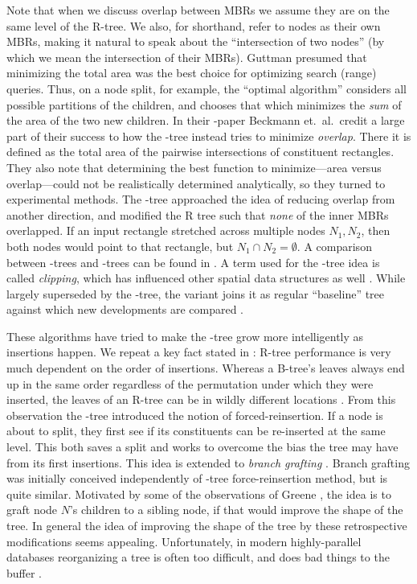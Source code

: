 Note that when we discuss overlap between MBRs we assume they are on the same level of the R-tree.
We also, for shorthand, refer to nodes as their own MBRs, making it natural to speak about the ``intersection of two nodes'' (by which we mean the intersection of their MBRs).
Guttman \cite{guttman84} presumed that minimizing the total area was the best choice for optimizing search (range) queries.
Thus, on a node split, for example, the ``optimal algorithm'' considers all possible partitions of the children, and chooses that which minimizes the \emph{sum} of the area of the two new children.
In their \rstar-paper \cite{beckmannkriegelschneiderseeger90} Beckmann et.\ al.\ credit a large part of their success to how the \rstar-tree instead tries to minimize \emph{overlap}.
There it is defined as the total area of the pairwise intersections of constituent rectangles.
They also note that determining the best function to minimize---area versus overlap---could not be realistically determined analytically, so they turned to experimental methods.
The \rplus-tree \cite{sellisroussopoulosfaloutsos87} approached the idea of reducing overlap from another direction, and modified the R tree such that \emph{none} of the inner MBRs overlapped.
If an input rectangle stretched across multiple nodes $N_1,N_2$, then both nodes would point to that rectangle, but $N_1\cap N_2=\emptyset$.
A comparison between \rbase-trees and \rplus-trees can be found in \cite{greene89}.
A term used for the \rplus-tree idea is called \emph{clipping}, which has influenced other spatial data structures as well \cite{gaedegunther98}.
While largely superseded by the \rstar-tree, the \rplus variant joins it as regular ``baseline'' tree against which new developments are compared \cite{thebook}.

These algorithms have tried to make the \rbase-tree grow more intelligently as insertions happen.
We repeat a key fact stated in \cite{beckmannkriegelschneiderseeger90}: R-tree performance is very much dependent on the order of insertions.
Whereas a B-tree's leaves always end up in the same order regardless of the permutation under which they were inserted, the leaves of an R-tree can be in wildly different locations \cite{gaedegunther98,beckmannkriegelschneiderseeger90,argeberghaverkortyi04}.
From this observation the \rstar-tree \cite{beckmannkriegelschneiderseeger90} introduced the notion of forced-reinsertion.
If a node is about to split, they first see if its constituents can be re-inserted at the same level.
This both saves a split and works to overcome the bias the tree may have from its first insertions.
This idea is extended to \emph{branch grafting} \cite{schrekchen00}.
Branch grafting was initially conceived independently of \rstar-tree force-reinsertion method, but is quite similar.
Motivated by some of the observations of Greene \cite{greene89}, the idea is to graft node $N$'s children to a sibling node, if that would improve the shape of the tree.
In general the idea of improving the shape of the tree by these retrospective modifications seems appealing.
Unfortunately, in modern highly-parallel databases reorganizing a tree is often too difficult, and does bad things to the buffer \cite{beckmannseeger09}.

